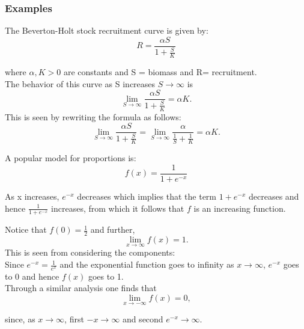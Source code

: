 \documentclass[12pt,a4paper]{article}
\theoremstyle{regla}
\theoremstyle{remark}
\theoremstyle{definition}
\theoremstyle{nonumberbreak}
\begin{document}
\subsubsection{Examples}
\begin{xmpl}
The Beverton-Holt stock recruitment curve is given by:
$$
R=\frac{\alpha S}{1+\frac{S}{K}}
$$

where $\alpha, K >0$ are constants and S = biomass and R= recruitment.\\

The behavior of this curve as S increases $S\rightarrow\infty$ is
$$
\lim_{S\to\infty}\frac{\alpha S}{1+\frac{S}{K}} =\alpha K .
$$
This is seen by rewriting the formula as follows:
$$
\lim_{S\to\infty}\frac{\alpha S}{1+\frac{S}{K}} =
\lim_{S\to\infty}\frac{\alpha }{\frac{1}{S}+\frac{1}{K}} =\alpha K .
$$

\end{xmpl}
\begin{xmpl}

A popular model for proportions is: 
$$
f(x) = \frac{1}{1+e^{-x}}
$$

As x increases, $e^{-x}$ decreases which implies that the
term $1+e^{-x}$ decreases and hence
$\frac{1}{1+e^{-x}}$ increases, from which it follows that $f$ is an
increasing function.

Notice that $f(0)=\frac{1}{2}$ and further, 
$$\lim_{x\to\infty} f(x) = 1.$$
This is seen from considering the 
components: \\
Since $e^{-x} = \frac{1}{e^{x}}$ and the exponential function goes to infinity as $x\to\infty$, $e^{-x}$
goes to $0$ and hence $f(x)$ goes to 1.\\

Through a similar analysis one finds that 
$$\lim_{x\to-\infty} f(x)=0 ,$$

 

since, as $x\rightarrow \infty$, first $-x\rightarrow \infty$ and second $e^{-x} \rightarrow \infty$.


\end{xmpl}
\end{document}
